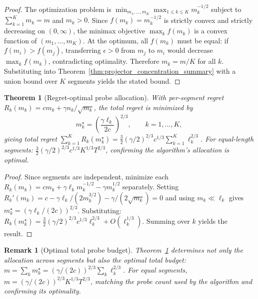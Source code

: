 \documentclass[11pt]{article}
\newtheorem{theorem}{Theorem}
\newtheorem{remark}{Remark}
\begin{document}
\begin{proof}
The optimization problem is
$\min_{m_1, \ldots, m_K} \max_{1 \le k \le K} m_k^{-1/2}$ subject to
$\sum_{k=1}^K m_k = m$ and $m_k > 0$.
Since $f(m_k) = m_k^{-1/2}$ is strictly convex and strictly decreasing on $(0, \infty)$,
the minimax objective $\max_k f(m_k)$ is a convex function of $(m_1, \ldots, m_K)$.
At the optimum, all $f(m_k)$ must be equal: if $f(m_i) > f(m_j)$, transferring
$\epsilon > 0$ from $m_j$ to $m_i$ would decrease $\max_k f(m_k)$, contradicting
optimality.
Therefore $m_k = m/K$ for all $k$.
Substituting into Theorem~\ref{thm:projector_concentration_summary} with a union bound
over $K$ segments yields the stated bound.
\end{proof}

\begin{theorem}[Regret-optimal probe allocation]
\label{thm:regret_allocation}
With per-segment regret
$R_k(m_k)=cm_k+\gamma n_k/\sqrt{m_k}$,
the total regret is minimized by
\begin{equation}
m_k^\star = \left(\frac{\gamma\ell_k}{2c}\right)^{2/3},
\qquad k=1,\ldots,K,
\label{eq:optimal_mk}
\end{equation}
giving total regret
$\sum_{k=1}^K R_k(m_k^\star)
= \frac{3}{2}(\gamma/2)^{2/3}c^{1/3}\sum_{k=1}^K\ell_k^{2/3}$.
For equal-length segments: $\frac{3}{2}(\gamma/2)^{2/3}c^{1/3}K^{1/3}T^{2/3}$,
confirming the algorithm's allocation is optimal.
\end{theorem}

\begin{proof}
Since segments are independent, minimize each $R_k(m_k)=cm_k+\gamma\ell_km_k^{-1/2}
-\gamma m_k^{1/2}$ separately.
Setting $R_k'(m_k)=c-\gamma\ell_k/(2m_k^{3/2})-\gamma/(2\sqrt{m_k})=0$ and
using $m_k\ll\ell_k$ gives $m_k^\star=(\gamma\ell_k/(2c))^{2/3}$.
Substituting: $R_k(m_k^\star)=\frac{3}{2}(\gamma/2)^{2/3}c^{1/3}\ell_k^{2/3}
+O(\ell_k^{1/3})$.
Summing over $k$ yields the result.
\end{proof}

\begin{remark}[Optimal total probe budget]
Theorem~\ref{thm:regret_allocation} determines not only the allocation across segments
but also the optimal total budget:
$m = \sum_k m_k^\star = (\gamma/(2c))^{2/3} \sum_k \ell_k^{2/3}$.
For equal segments, $m = (\gamma/(2c))^{2/3} K^{1/3} T^{2/3}$, matching the probe
count used by the algorithm and confirming its optimality.
\end{remark}
\end{document}
